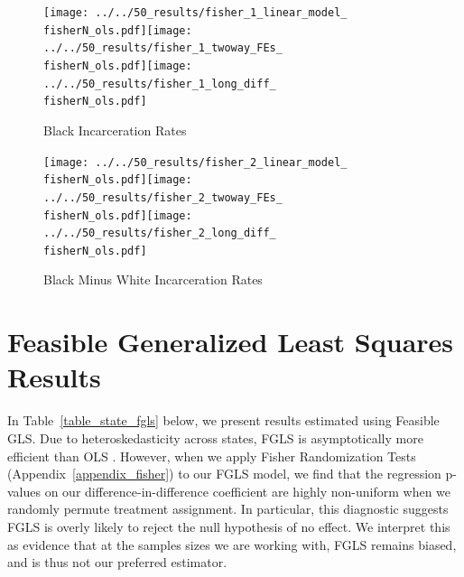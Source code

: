 \documentclass[12pt]{article}
\begin{document}
\begin{figure}[h!]
	\centering
	\caption{Black Incarceration Rates}\label{figure_fisher1}
	\texttt{[image: ../../50\_results/fisher\_1\_linear\_model\_\\fisherN\_ols.pdf]}\texttt{[image: ../../50\_results/fisher\_1\_twoway\_FEs\_\\fisherN\_ols.pdf]}\texttt{[image: ../../50\_results/fisher\_1\_long\_diff\_\\fisherN\_ols.pdf]}
\end{figure}


\begin{figure}[h!]
	\centering
	\caption{Black Minus White Incarceration Rates}\label{figure_fisher2}
	\texttt{[image: ../../50\_results/fisher\_2\_linear\_model\_\\fisherN\_ols.pdf]}\texttt{[image: ../../50\_results/fisher\_2\_twoway\_FEs\_\\fisherN\_ols.pdf]}\texttt{[image: ../../50\_results/fisher\_2\_long\_diff\_\\fisherN\_ols.pdf]}
\end{figure}


\section{Feasible Generalized Least Squares Results}\label{appendix_fgls}
\setcounter{table}{0}
\setcounter{figure}{0}
\renewcommand{\thetable}{K\arabic{table}}
\renewcommand{\thefigure}{K\arabic{figure}}
\normalsize

In Table~\ref{table_state_fgls} below, we present results estimated using Feasible GLS. Due to heteroskedasticity across states, FGLS is asymptotically more efficient than OLS . However, when we apply Fisher Randomization Tests (Appendix~\ref{appendix_fisher}) to our FGLS model, we find that the regression p-values on our difference-in-difference coefficient are highly non-uniform when we randomly permute treatment assignment. In particular, this diagnostic suggests FGLS is overly likely to reject the null hypothesis of no effect. We interpret this as evidence that at the samples sizes we are working with, FGLS remains biased, and is thus not our preferred estimator.
\end{document}
